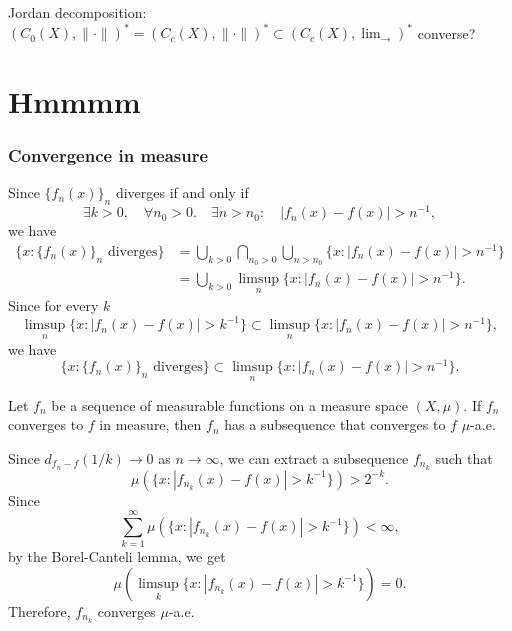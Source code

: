 \documentclass{../crs}
\begin{document}
Jordan decomposition: $(C_0(X),\|\cdot\|)^*=(C_c(X),\|\cdot\|)^*\subset(C_c(X),\lim_{\to})^*$
converse?




\chapter{Hmmmm}

\subsection{Convergence in measure}
Since $\{f_n(x)\}_n$ diverges if and only if
\[\exists k>0,\quad\forall n_0>0.\quad\exists n>n_0:\quad |f_n(x)-f(x)|>n^{-1},\]
we have
\begin{align*}
\{x:\{f_n(x)\}_n\text{ diverges}\}&=\bigcup_{k>0}\bigcap_{n_0>0}\bigcup_{n>n_0}\{x:|f_n(x)-f(x)|>n^{-1}\}\\
&=\bigcup_{k>0}\limsup_n\{x:|f_n(x)-f(x)|>n^{-1}\}.
\end{align*}
Since for every $k$
\[\limsup_n\{x:|f_n(x)-f(x)|>k^{-1}\}\subset\limsup_n\{x:|f_n(x)-f(x)|>n^{-1}\},\]
we have
\[\{x:\{f_n(x)\}_n\text{ diverges}\}\subset\limsup_n\{x:|f_n(x)-f(x)|>n^{-1}\}.\]




\begin{thm}
Let $f_n$ be a sequence of measurable functions on a measure space $(X,\mu)$.
If $f_n$ converges to $f$ in measure, then $f_n$ has a subsequence that converges to $f$ $\mu$-a.e.
\end{thm}
\begin{pf}
Since $d_{f_n-f}(1/k)\to0$ as $n\to\infty$, we can extract a subsequence $f_{n_k}$ such that
\[\mu(\{x:|f_{n_k}(x)-f(x)|>k^{-1}\})>2^{-k}.\]
Since
\[\sum_{k=1}^\infty\mu(\{x:|f_{n_k}(x)-f(x)|>k^{-1}\})<\infty,\]
by the Borel-Canteli lemma, we get
\[\mu(\limsup_k\{x:|f_{n_k}(x)-f(x)|>k^{-1}\})=0.\]
Therefore, $f_{n_k}$ converges $\mu$-a.e.
\end{pf}
\end{document}
